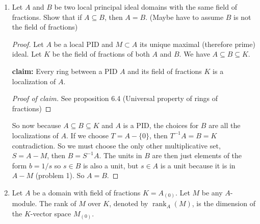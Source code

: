 \documentclass[hidelinks,12pt]{article}
\begin{document}
\begin{enumerate}
\begin{proof}
\begin{align*}
                            &=\left\{\sum_{j=1}^{n}a_{j}m_{j}\mid a_{j}\in A,\ m_{j}\in M,\ n\in N\right\}
            \end{align*}
            Let \(x\in M\), then \(x\) is a linear combination of the basis \(\{m_{1},\dots,m_{n}\}\) with coefficients from \(\mathcal{M}\) and with coefficients from \(A\):
            \begin{align*}
                x&=\mu_{1}m_{1}+\mu_{2}m_{2}+\dots+\mu_{n}m_{n}\\
            x&=a_{1}m_{1}+a_{2}m_{2}+\dots+a_{n}m_{n}\\
           \implies 0&=(a_{1}-\mu_{1})m_{1}+\dots+(a_{n}-\mu_{n})m_{n}\\
            \end{align*}
            Since \(\{m_{1},\dots,m_{n}\}\) is a basis, we have either \((a_{i}-\mu_{i})=0\) or \(m_{i}=0\) for all \(i\in\{1,\dots,n\}\). However, by problem 1, any element of the form \(a+m\) for \(a\in A\) and \(m\in\mathcal{M}\) is a unit, so \(a_{i}-\mu_{i}\neq0\) which means \(m_{i}=0\) for all \(i\), and so \(M=(0)\).
        \end{proof}
    \item Let \(A\) and \(B\) be two local principal ideal domains with the same field of fractions. Show that if \(A\subseteq B\), then \(A=B\). (Maybe have to assume \(B\) is not the field of fractions)
        \begin{proof}
           Let \(A\) be a local PID and \(M\subset A\) its unique maximal (therefore prime) ideal. Let \(K\) be the field of fractions of both \(A\) and \(B\). We have \(A\subseteq B\subseteq K\).\par \textbf{claim:} Every ring between a PID \(A\) and its field of fractions \(K\) is a localization of \(A\). \begin{proof}[Proof of claim]
          See proposition 6.4 (Universal property of rings of fractions)  
            \end{proof}
            So now because \(A\subseteq B\subseteq K\) and \(A\) is a PID, the choices for \(B\) are all the localizations of \(A\). If we choose \(T=A-\{0\}\), then \(T^{-1}A=B=K\) contradiction. So we must choose the only other multiplicative set, \(S=A-M\), then \(B=S^{-1}A\). The units in \(B\) are then just elements of the form \(b=1/s\) so \(s\in B\) is also a unit, but \(s\in A\) is a unit because it is in \(A-M\) (problem 1). So \(A=B\).
        \end{proof}
    \item Let \(A\) be a domain with field of fractions \(K=A_{(0)}\). Let \(M\) be any \(A\)-module. The rank of \(M\) over \(K\), denoted by \(\operatorname{rank}_{A}(M)\), is the dimension of the \(K\)-vector space \(M_{(0)}\).

\end{enumerate}
\end{document}
